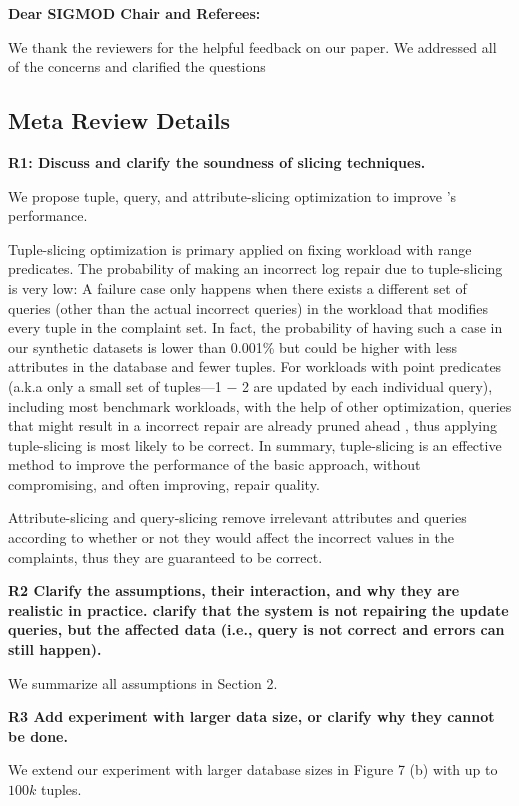 \textbf{Dear SIGMOD Chair and Referees:}

We thank the reviewers for the helpful feedback on our paper. We addressed all of the concerns and clarified the questions

\subsection*{Meta Review Details}
\noindent \textbf{R1: Discuss and clarify the soundness of slicing techniques.} 

We propose tuple, query, and attribute-slicing optimization to improve \sys's performance. 

Tuple-slicing optimization is primary applied on fixing workload with range predicates. The probability of making an incorrect log repair due to tuple-slicing is very low: A failure case only happens when there exists a different set of queries (other than the actual incorrect queries) in the workload that modifies every tuple in the complaint set. In fact, the probability of having such a case in our synthetic datasets is lower than 0.001\% but could be higher with less attributes in the database and fewer tuples. For workloads with point predicates (a.k.a only a small set of tuples—1 − 2 are updated by each individual query), including most benchmark workloads, with the help of other optimization, queries that might result in a incorrect repair are already pruned ahead , thus applying tuple-slicing is most likely to be correct. In summary, tuple-slicing is an effective method to improve the performance of the basic approach, without compromising, and often improving, repair quality.

Attribute-slicing and query-slicing remove irrelevant attributes and queries according to whether or not they would affect the incorrect values in the complaints, thus they are guaranteed to be correct. 

\noindent \textbf{R2 Clarify the assumptions, their interaction, and why they are realistic in practice. clarify that the system is not repairing the update queries, but the affected data (i.e., query is not correct and errors can still happen).} 

We summarize all assumptions in Section 2. 

\noindent \textbf{R3 Add experiment with larger data size, or clarify why they cannot be done.}

We extend our experiment with larger database sizes in Figure 7 (b) with up to $100k$ tuples. 

